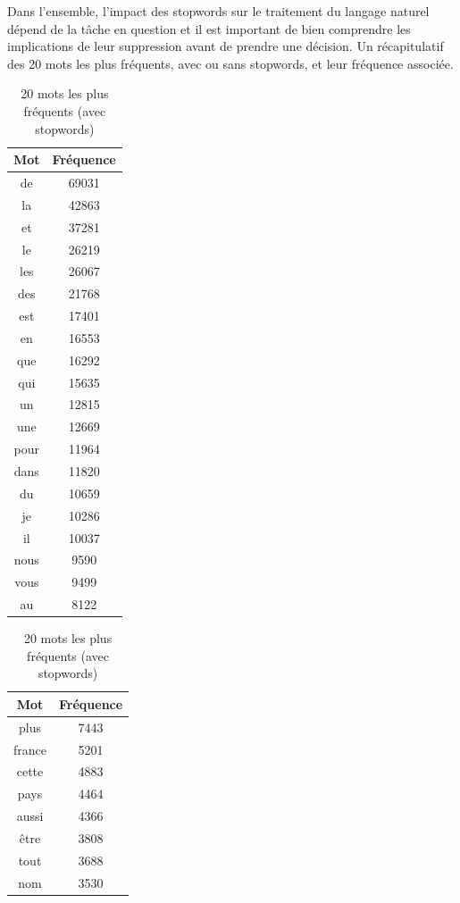 \documentclass{article}
\begin{document}
Dans l'ensemble, l'impact des stopwords sur le traitement du langage naturel dépend de la tâche en question et il est important de bien comprendre les implications de leur suppression avant de prendre une décision. Un récapitulatif des 20 mots les plus fréquents, avec ou sans stopwords, et leur fréquence associée.

\begin{table}[H]
\centering
\begin{subtable}{0.45\linewidth}
\centering
\begin{tabular}{|c|c|}
\hline
\textbf{Mot} & \textbf{Fréquence} \\
\hline
de & 69031 \\
la & 42863 \\
et & 37281 \\
le & 26219 \\
les & 26067 \\
des & 21768 \\
est & 17401 \\
en & 16553 \\
que & 16292 \\
qui & 15635 \\
un & 12815 \\
une & 12669 \\
pour & 11964 \\
dans & 11820 \\
du & 10659 \\
je & 10286 \\
il & 10037 \\
nous & 9590 \\
vous & 9499 \\
au & 8122 \\
\hline
\end{tabular}
\caption{20 mots les plus fréquents (avec stopwords)}
\end{subtable}
\hfill
\begin{subtable}{0.45\linewidth}
\centering
\begin{tabular}{|c|c|}
\hline
\textbf{Mot} & \textbf{Fréquence} \\
\hline
plus & 7443 \\
france & 5201 \\
cette & 4883 \\
pays & 4464 \\
aussi & 4366 \\
être & 3808 \\
tout & 3688 \\
nom & 3530 \\

\end{tabular}
\end{subtable}
\end{table}
\end{document}
